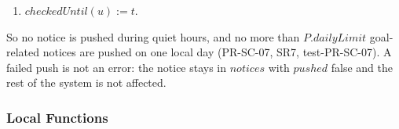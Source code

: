 \documentclass[12pt, titlepage]{article}
\begin{document}
\begin{itemize}
\begin{enumerate}
    new notice with time $t$, after deciding whether to push it. It is pushed
    if $\neg \mathit{quiet}(t, u)$, and either $c.\mathit{kind} \notin$
    GoalRelated or $\mathit{pushedToday}(u, D) < P.\mathit{dailyLimit}$. If
    so, $\mathit{push}(d, c.\mathit{text})$ is called for each $d \in
    \mathit{devices}(u)$, and $\mathit{pushed}$ is true if any call returns
    true. Otherwise $\mathit{pushed}$ is false. Candidates are handled in the
    order listed above, so each push counts towards the limit for the next.
  \item $\mathit{checkedUntil}(u) := t$.
  \end{enumerate}
\end{itemize}

\noindent So no notice is pushed during quiet hours, and no more than
$P.\mathit{dailyLimit}$ goal-related notices are pushed on one local day
(PR-SC-07, SR7, test-PR-SC-07). A failed push is not an error: the notice
stays in $\mathit{notices}$ with $\mathit{pushed}$ false and the rest of the
system is not affected.

\subsubsection{Local Functions}
\end{document}
